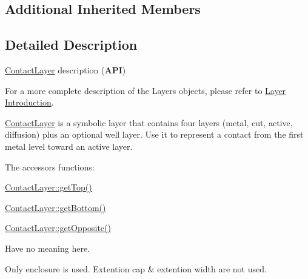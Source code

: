 \subsection*{Additional Inherited Members}


\subsection{Detailed Description}
\hyperlink{classHurricane_1_1ContactLayer}{Contact\-Layer} description ({\bfseries A\-P\-I}) 

For a more complete description of the Layers objects, please refer to \hyperlink{classHurricane_1_1Layer_secLayerIntro}{Layer Introduction}.

\hyperlink{classHurricane_1_1ContactLayer}{Contact\-Layer} is a symbolic layer that contains four layers (metal, cut, active, diffusion) plus an optional well layer. Use it to represent a contact from the first metal level toward an active layer.

The accessors functions\-: 
\begin{DoxyItemize}
\item \hyperlink{classHurricane_1_1Layer_a00213c29884bfd396576c9cf2fb8ed59}{Contact\-Layer\-::get\-Top()} 
\item \hyperlink{classHurricane_1_1Layer_a5398b082b8a441c13d5b54c3cefff685}{Contact\-Layer\-::get\-Bottom()} 
\item \hyperlink{classHurricane_1_1Layer_a97d8901ab1e4598d0783aeb89f55421a}{Contact\-Layer\-::get\-Opposite()} 
\end{DoxyItemize}Have no meaning here.

Only enclosure is used. Extention cap \& extention width are not used. 

